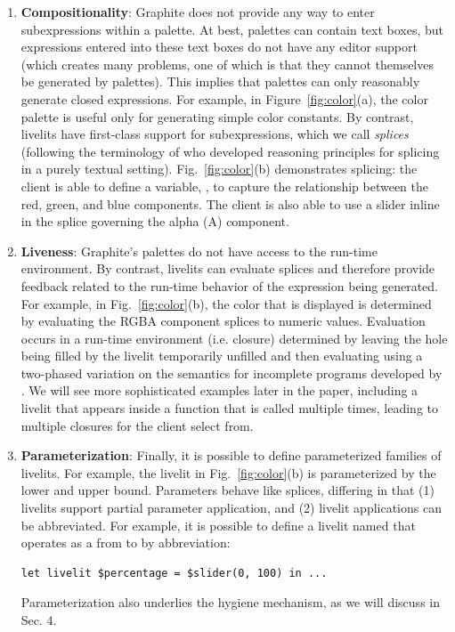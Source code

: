 \begin{enumerate}
  \item \textbf{Compositionality}: 
  Graphite does not provide any way to {enter subexpressions within a palette}.
  At best, palettes can contain text boxes, but expressions entered into these text boxes 
  do not have any editor support (which creates many problems, one of which is that they cannot themselves be generated by palettes). 
  This implies that palettes can only reasonably generate {closed expressions}. 
  For example, in Figure~\ref{fig:color}(a), the color palette
  is useful only for generating simple color constants. 
  By contrast, livelits have first-class support for subexpressions, which we call \emph{splices} (following
  the terminology of \citet{TLMs} who developed reasoning principles for splicing in a purely textual setting).
  Fig.~\ref{fig:color}(b) demonstrates splicing: the client is able to define a variable, , 
  to capture the relationship between the red, green, and blue components.
  The client is also able to use a slider inline in the splice governing 
  the alpha (A) component.
  \item \textbf{Liveness}: Graphite's palettes do not have 
  access to the run-time environment. By contrast, livelits can evaluate splices
  and therefore provide feedback related to the run-time behavior of the expression being generated. 
  For example, in Fig.~\ref{fig:color}(b), the color that is displayed is determined by evaluating the RGBA 
  component splices to numeric values.
  Evaluation occurs in a run-time environment (i.e. closure) determined by 
  leaving the hole being filled by the livelit temporarily unfilled and then evaluating
  using a two-phased variation on the semantics for incomplete programs developed by \citet{HazelnutLive}. 
  We will see more sophisticated examples later in the paper, including a livelit 
  that appears inside a function that is called multiple times, leading to multiple closures for the client 
  select from.
  \item \textbf{Parameterization}: Finally, it is possible to define parameterized families of livelits. 
  For example, the  livelit in Fig.~\ref{fig:color}(b) is parameterized by the lower and upper bound. 
  Parameters behave like splices, differing in that (1) livelits support partial parameter application, and (2) 
  livelit applications can be abbreviated. For example, it is possible to define a livelit named  
  that operates as a  from  to  by abbreviation:
  \begin{lstlisting}[numbers=none]
  let livelit $percentage = $slider(0, 100) in ...
  \end{lstlisting}
  Parameterization also underlies the hygiene mechanism, as we will discuss in Sec. 4.
\end{enumerate}
\clearpage

